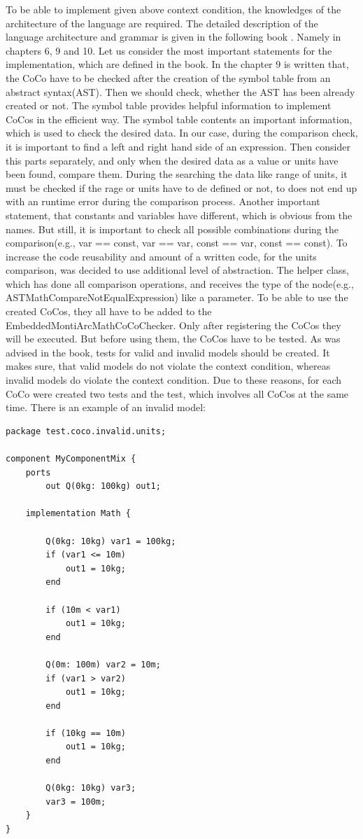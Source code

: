 To be able to implement given above context condition, the knowledges of the architecture of the language are required. The detailed description of the language architecture and grammar is given in the following book \cite{HR17}. Namely in chapters 6, 9 and 10. Let us consider the most important statements for the implementation, which are defined in the book. In the chapter 9 is written that, the CoCo have to be checked after the creation of the symbol table from an abstract syntax(AST). Then we should check, whether the AST has been already created or not. The symbol table provides helpful information to implement CoCos in the efficient way. The symbol table contents an important information, which is used to check the desired data. In our case, during the comparison check, it is important to find a left and right hand side of an expression. Then consider this parts separately, and only when the desired data as a value or units have been found, compare them. During the searching the data like range of units, it must be checked if the rage or units have to de defined or not, to does not end up with an runtime error during the comparison process. Another important statement, that constants and variables have different, which is obvious from the names. But still, it is important to check all possible combinations during the comparison(e.g., var == const, var == var, const == var, const == const). To increase the code reusability and amount of a written code, for the units comparison, was decided to use additional level of abstraction. The helper class, which has done all comparison operations, and receives the type of the node(e.g., ASTMathCompareNotEqualExpression) like a parameter. \newline
To be able to use the created CoCos, they all have to be added to the EmbeddedMontiArcMathCoCoChecker. Only after registering the CoCos they will be executed. But before using them, the CoCos have to be tested.\newline
As was advised in the book, tests for valid and invalid models should be created. It makes sure, that valid models do not violate the context condition, whereas invalid models do violate the context condition. Due to these reasons, for each CoCo were created two tests and the test, which involves all CoCos at the same time. There is an example of an invalid model:
\bigskip
\begin{lstlisting}
package test.coco.invalid.units;

component MyComponentMix {
    ports
        out Q(0kg: 100kg) out1;

    implementation Math {

        Q(0kg: 10kg) var1 = 100kg;
        if (var1 <= 10m)              
            out1 = 10kg;
        end

        if (10m < var1)
            out1 = 10kg;
        end

        Q(0m: 100m) var2 = 10m;
        if (var1 > var2)
            out1 = 10kg;
        end

        if (10kg == 10m)
            out1 = 10kg;
        end

        Q(0kg: 10kg) var3;
        var3 = 100m;
    }
}
\end{lstlisting}
